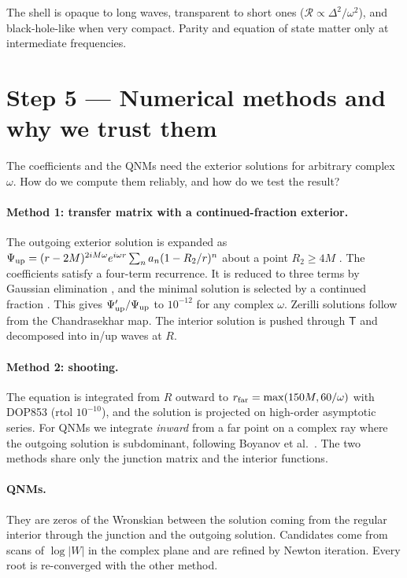 \documentclass[11pt,a4paper]{article}
\numberwithin{equation}{section}
\newcommand{\RR}{\mathcal R}
\begin{document}
\begin{learned}
The shell is opaque to long waves, transparent to short ones ($\RR\propto\Delta^2/\omega^2$), and black-hole-like when very
compact. Parity and equation of state matter only at intermediate frequencies.
\end{learned}

\section{Step 5 --- Numerical methods and why we trust them}\label{sec:num}
\begin{question}
The coefficients and the QNMs need the exterior solutions for arbitrary complex $\omega$. How do we compute them
reliably, and how do we test the result?
\end{question}
\paragraph{Method 1: transfer matrix with a continued-fraction exterior.} The outgoing exterior solution is expanded as
$\Psi_{\rm up}=(r-2M)^{2iM\omega}e^{i\omega r}\sum_na_n(1-R_2/r)^n$ about a point $R_2\ge4M$
\cite{LNS93,Pani09}. The coefficients satisfy a four-term recurrence. It is reduced to three terms by Gaussian
elimination \cite{Leaver90}, and the minimal solution is selected by a continued fraction \cite{Gautschi67}. This gives
$\Psi_{\rm up}'/\Psi_{\rm up}$ to $10^{-12}$ for any complex $\omega$. Zerilli solutions follow from the Chandrasekhar map.
The interior solution is pushed through $\mathsf T$ and decomposed into in/up waves at $R$.
\paragraph{Method 2: shooting.} The equation is integrated from $R$ outward to $r_{\rm far}=\max(150M,60/\omega)$ with DOP853
\cite{Hairer93,SciPy20} (rtol $10^{-10}$), and the solution is projected on high-order asymptotic series. For QNMs we
integrate \emph{inward} from a far point on a complex ray where the outgoing solution is subdominant, following
Boyanov et al.\ \cite{Boyanov25}. The two methods share only the junction matrix and the interior functions.
\paragraph{QNMs.} They are zeros of the Wronskian between the solution coming from the regular interior through the
junction and the outgoing solution. Candidates come from scans of $\log|W|$ in the complex plane and are refined by
Newton iteration. Every root is re-converged with the other method.
\end{document}
